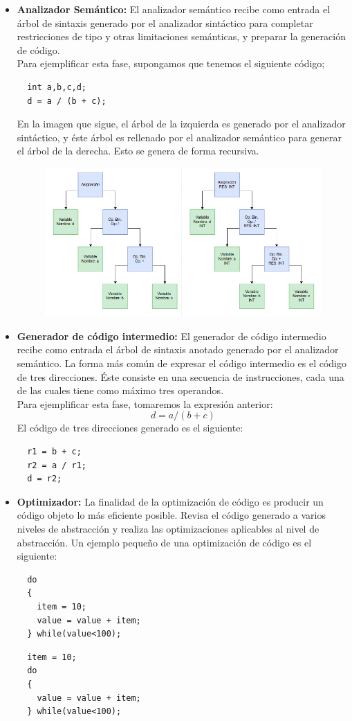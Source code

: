 \documentclass[a4paper,12pt]{article}
\begin{document}
\begin{enumerate}
\begin{itemize}
  \item \textbf{Analizador Semántico:} El analizador semántico recibe como entrada el árbol de sintaxis generado por el
  analizador sintáctico para completar restricciones de tipo y otras limitaciones semánticas, y preparar la generación
  de código. \\
  Para ejemplificar esta fase, supongamos que tenemos el siguiente código;
  \begin{lstlisting}
  int a,b,c,d;
  d = a / (b + c);
  \end{lstlisting}
  En la imagen que sigue, el árbol de la izquierda es generado por el analizador sintáctico, y éste árbol es rellenado por
  el analizador semántico para generar el árbol de la derecha. Esto se genera de forma recursiva.
  \begin{figure}[H]
   \centering
   \includegraphics[scale = 0.5]{2.png}
  \end{figure}
  
  \item \textbf{Generador de código intermedio: } El generador de código intermedio recibe como entrada el árbol de sintaxis anotado generado
  por el analizador semántico. La forma más común de expresar el código intermedio es el código de tres direcciones. Éste consiste en una secuencia
  de instrucciones, cada una de las cuales tiene como máximo tres operandos. \\
  Para ejemplificar esta fase, tomaremos la expresión anterior:
  $$d = a / (b + c)$$
  El código de tres direcciones generado es el siguiente:
  \begin{lstlisting}
  r1 = b + c;
  r2 = a / r1;
  d = r2;
  \end{lstlisting}
  
  \item \textbf{Optimizador:}  La finalidad de la optimización de código es producir un código objeto lo más eficiente posible. 
  Revisa el código generado a varios niveles de abstracción y realiza las optimizaciones aplicables al nivel de abstracción.
  Un ejemplo pequeño de una optimización de código es el siguiente:
  \begin{lstlisting}
  do
  {
    item = 10;
    value = value + item; 
  } while(value<100);
  \end{lstlisting}
  \begin{lstlisting}
  item = 10;
  do
  {
    value = value + item; 
  } while(value<100);
  \end{lstlisting}
  

\end{itemize}
\end{enumerate}
\end{document}
